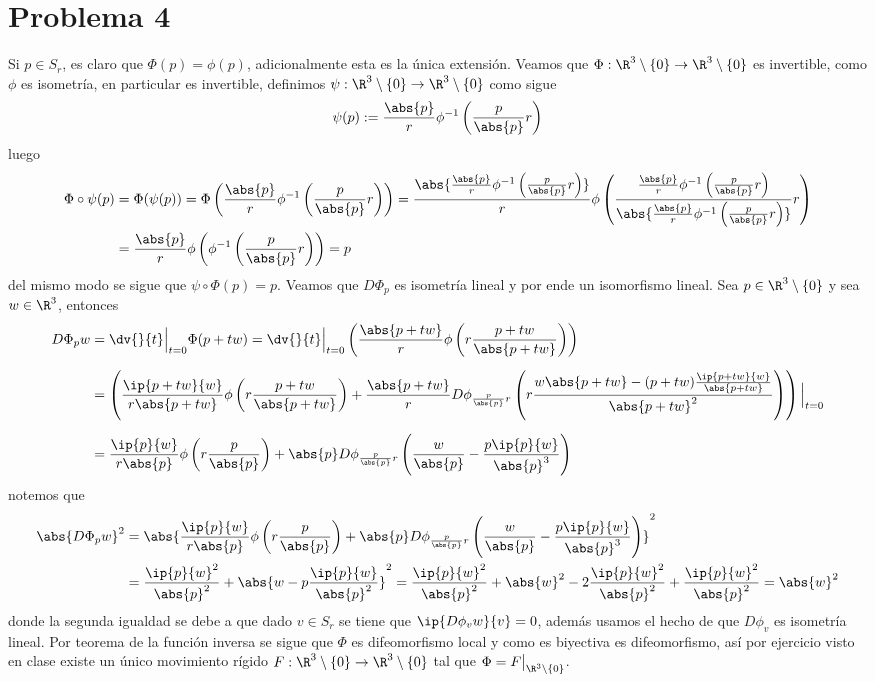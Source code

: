 \documentclass{article}
\begin{document}
\section*{Problema 4}
\noindent Si $p\in S_{r}$, es claro que $\Phi(p)=\phi(p)$, adicionalmente esta es la única extensión. Veamos que $\Phi:\R^{3}\setminus\{0\}\to
\R^{3}\setminus\{0\}$ es invertible, como $\phi$ es isometría, en particular es invertible, 
definimos $\psi:\R^{3}\setminus\{0\}\to\R^{3}\setminus\{0\}$ como sigue
\begin{equation*}
    \psi(p):=\frac{\abs{p}}{r}\phi^{-1}\left(\frac{p}{\abs{p}}r\right)
\end{equation*}
luego
\begin{align*}
    \Phi\circ\psi(p) &= \Phi(\psi(p))=\Phi\left(\frac{\abs{p}}{r}\phi^{-1}
    \left(\frac{p}{\abs{p}}r\right)\right)=\frac{\abs{\frac{\abs{p}}{r}\phi^{-1}\left(\frac{p}
    {\abs{p}}r\right)}}{r}\phi\left(\frac{\frac{\abs{p}}{r}\phi^{-1}\left(\frac{p}
    {\abs{p}}r\right)}{\abs{\frac{\abs{p}}{r}\phi^{-1}\left(\frac{p}{\abs{p}}r\right)}}r\right) \\
    &= \frac{\abs{p}}{r}\phi\left(\phi^{-1}\left(\frac{p}{\abs{p}}r\right)\right)=p
\end{align*}
del mismo modo se sigue que $\psi\circ\Phi(p)=p$. Veamos que $D\Phi_{p}$ es isometría lineal y por 
ende un isomorfismo lineal. Sea $p\in\R^{3}\setminus\{0\}$ y sea $w\in\R^{3}$, entonces
\begin{align*}
    D\Phi_{p}w &= \dv{}{t}\Big|_{t=0}\Phi(p+tw)=\dv{}{t}\Big|_{t=0}\left(\frac{\abs{p+tw}}{r}\phi
    \left(r\frac{p+tw}{\abs{p+tw}}\right)\right) \\[2mm]
    &= \left(\frac{\ip{p+tw}{w}}{r\abs{p+tw}}\phi\left(r\frac{p+tw}{\abs{p+tw}}\right)
    +\frac{\abs{p+tw}}{r}D\phi_{\frac{p}{\abs{p}}r}\left(r\frac{w\abs{p+tw}-(p+tw)
    \frac{\ip{p+tw}{w}}{\abs{p+tw}}}{\abs{p+tw}^{2}}\right)\right)\Big|_{t=0} \\[2mm]
    &= \frac{\ip{p}{w}}{r\abs{p}}\phi\left(r\frac{p}{\abs{p}}\right)+\abs{p}
    D\phi_{\frac{p}{\abs{p}}r}\left(\frac{w}{\abs{p}}-\frac{p\ip{p}{w}}{\abs{p}^{3}}\right)
\end{align*}
notemos que
\begin{align*}
    \abs{D\Phi_{p}w}^{2} &= \abs{\frac{\ip{p}{w}}{r\abs{p}}\phi\left(r\frac{p}{\abs{p}}\right)+
    \abs{p}D\phi_{\frac{p}{\abs{p}}r}\left(\frac{w}{\abs{p}}-\frac{p\ip{p}{w}}{\abs{p}^{3}}
    \right)}^{2} \\
    &= \frac{\ip{p}{w}^{2}}{\abs{p}^{2}}+\abs{w-p\frac{\ip{p}{w}}{\abs{p}^{2}}}^{2}
    =\frac{\ip{p}{w}^{2}}{\abs{p}^{2}}+\abs{w}^{2}-2\frac{\ip{p}{w}^{2}}{\abs{p}^{2}}
    +\frac{\ip{p}{w}^{2}}{\abs{p}^{2}}=\abs{w}^{2}
\end{align*}
donde la segunda igualdad se debe a que dado $v\in S_{r}$ se tiene que $\ip{D\phi_{v}w}{v}=0$, 
además usamos el hecho de que $D\phi_{v}$ es isometría lineal. Por teorema de la función inversa
se sigue que $\Phi$ es difeomorfismo local y como es biyectiva es difeomorfismo, así por ejercicio
visto en clase existe un único movimiento rígido $F:\R^{3}\setminus\{0\}\to\R^{3}\setminus\{0\}$ 
tal que $\Phi=F\big|_{\R^{3}\setminus\{0\}}$.
\end{document}
